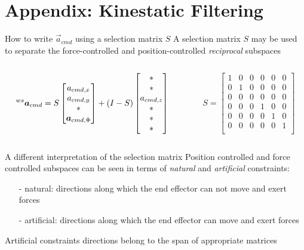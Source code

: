 \section{Appendix: Kinestatic Filtering}

\begin{frame}{How to write $\vec{a}_{cmd}$ using a selection matrix $S$}
  A selection matrix $S$ \alert{may} be used to separate the force-controlled 
  and position-controlled \emph{reciprocal} subspaces
  \begin{columns}
    \begin{column}{0.6\textwidth}
      \[  
      \prescript{ws}{}{\vec{a}}_{cmd} = S 
        \begin{bmatrix}
          a_{cmd,x} \\
          a_{cmd,y} \\
          * \\
          \vec{a}_{cmd,\Phi}
        \end{bmatrix} + (I - S) 
        \begin{bmatrix}        
          * \\ * \\ a_{cmd,z} \\ * \\ * \\ *
        \end{bmatrix}
      \]
    \end{column}
    \begin{column}{0.35\columnwidth}
      \[
      S =
        \begin {bmatrix}
          1 & 0 & 0 & 0 & 0 & 0\\
          0 & 1 & 0 & 0 & 0 & 0\\
          0 & 0 & 0 & 0 & 0 & 0\\
          0 & 0 & 0 & 1 & 0 & 0\\
          0 & 0 & 0 & 0 & 1 & 0\\
          0 & 0 & 0 & 0 & 0 & 1\\
        \end {bmatrix}
      \]
    \end{column}
  \end{columns}
\end{frame}

\begin{frame}{A different interpretation of the selection matrix}
  Position controlled and force controlled subspaces can be seen in terms of
  \emph{natural} and \emph{artificial} constraints:
  \begin{itemize}
  \item[-]natural: directions along which the end effector can not move and exert forces
  \item[-]artificial: directions along which the end effector can move and exert forces
  \end{itemize}
  \par
  Artificial constraints directions belong to the span of appropriate matrices
\end{frame}

